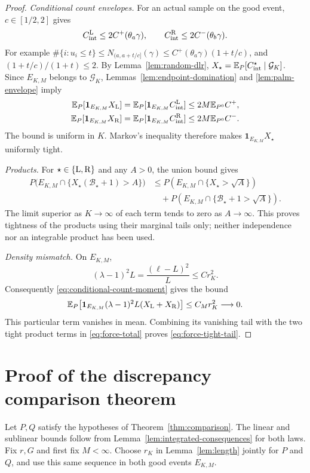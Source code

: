\documentclass[11pt,reqno]{amsart}
\numberwithin{equation}{section}
\theoremstyle{definition}
\theoremstyle{remark}
\newcommand{\E}{\mathbb E}
\newcommand{\1}{\mathbf 1}
\newcommand{\calB}{\mathcal B}
\newcommand{\calG}{\mathcal G}
\begin{document}
\begin{proof}
\emph{Conditional count envelopes.}
For an actual sample on the good event, $c\in[1/2,2]$ gives
\[
C_{\rm int}^{\rm L}\le2C^+(\theta_a\gamma),\qquad
C_{\rm int}^{\rm R}\le2C^-(\theta_b\gamma).
\]
For example $\#\{i:u_i\le t\}\le
N_{(a,a+t/c]}(\gamma)\le C^+(\theta_a\gamma)(1+t/c)$,
and $(1+t/c)/(1+t)\le2$. By Lemma~\ref{lem:random-dlr},
$X_\star=\E_P[C_{\rm int}^\star\mid\calG_K]$. Since $E_{K,M}$ belongs
to $\calG_K$, Lemmas~\ref{lem:endpoint-domination} and
\ref{lem:palm-envelope} imply
\begin{equation}\label{eq:conditional-count-moment}
\begin{aligned}
\E_P[\1_{E_{K,M}}X_{\rm L}]
 &=\E_P[\1_{E_{K,M}}C_{\rm int}^{\rm L}]
 \le2M\E_{P^0}C^+,\\
\E_P[\1_{E_{K,M}}X_{\rm R}]
 &=\E_P[\1_{E_{K,M}}C_{\rm int}^{\rm R}]
 \le2M\E_{P^0}C^-.
\end{aligned}
\end{equation}
The bound is uniform in $K$. Markov's inequality therefore makes
$\1_{E_{K,M}}X_\star$ uniformly tight.

\emph{Products.}
For $\star\in\{{\rm L},{\rm R}\}$ and any $A>0$, the union bound gives
\begin{align*}
P\bigl(E_{K,M}\cap\{X_\star(\calB_\star+1)>A\}\bigr)
&\le P(E_{K,M}\cap\{X_\star>\sqrt A\})\\
&\quad+P(E_{K,M}\cap\{\calB_\star+1>\sqrt A\}).
\end{align*}
The limit superior as $K\to\infty$ of each term tends to zero as
$A\to\infty$. This
proves tightness of the products using their marginal tails only;
neither independence nor an integrable product has been used.

\emph{Density mismatch.}
On $E_{K,M}$,
\[
(\lambda-1)^2L=\frac{(\ell-L)^2}{L}\le Cr_K^2.
\]
Consequently \eqref{eq:conditional-count-moment} gives the bound
\[
\E_P\bigl[\1_{E_{K,M}}(\lambda-1)^2L(X_{\rm L}+X_{\rm R})\bigr]
\le C_Mr_K^2\longrightarrow0.
\]
This particular term vanishes in mean. Combining its vanishing tail
with the two tight product terms in \eqref{eq:force-total} proves
\eqref{eq:force-tight-tail}.
\end{proof}

\section{Proof of the discrepancy comparison theorem}
\label{sec:proof-main}

Let $P,Q$ satisfy the hypotheses of Theorem~\ref{thm:comparison}.
The linear and sublinear bounds follow from
Lemma~\ref{lem:integrated-consequences} for both laws.
Fix $r,G$ and first fix $M<\infty$. Choose $r_K$ in Lemma~\ref{lem:length} jointly for $P$ and
$Q$, and use this same sequence in both good events $E_{K,M}$.
\end{document}
